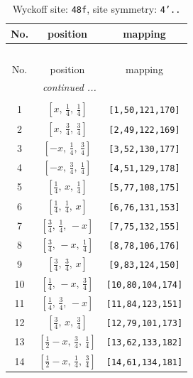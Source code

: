 \documentclass[fleqn,8pt]{jsarticle}
\begin{document}
\begin{longtable}{ccc}
\caption{Wyckoff site: {\tt 48f}, site symmetry: {\tt 4'..}}
 \\
 \hline \hline
No. & position & mapping \\ \hline \endfirsthead

\multicolumn{2}{l}{\tablename\ \thetable{}} \\
 \hline \hline
No. & position & mapping \\ \hline \endhead

 \hline \hline
\multicolumn{2}{r}{\footnotesize\it continued ...} \\ \endfoot

 \hline \hline
\multicolumn{2}{r}{} \\ \endlastfoot

1 & $\left[ x,\, \frac{1}{4},\, \frac{1}{4} \right]$ & {\tt [1,50,121,170]} \\ \hline
2 & $\left[ x,\, \frac{3}{4},\, \frac{3}{4} \right]$ & {\tt [2,49,122,169]} \\ \hline
3 & $\left[ - x,\, \frac{1}{4},\, \frac{3}{4} \right]$ & {\tt [3,52,130,177]} \\ \hline
4 & $\left[ - x,\, \frac{3}{4},\, \frac{1}{4} \right]$ & {\tt [4,51,129,178]} \\ \hline
5 & $\left[ \frac{1}{4},\, x,\, \frac{1}{4} \right]$ & {\tt [5,77,108,175]} \\ \hline
6 & $\left[ \frac{1}{4},\, \frac{1}{4},\, x \right]$ & {\tt [6,76,131,153]} \\ \hline
7 & $\left[ \frac{3}{4},\, \frac{1}{4},\, - x \right]$ & {\tt [7,75,132,155]} \\ \hline
8 & $\left[ \frac{3}{4},\, - x,\, \frac{1}{4} \right]$ & {\tt [8,78,106,176]} \\ \hline
9 & $\left[ \frac{3}{4},\, \frac{3}{4},\, x \right]$ & {\tt [9,83,124,150]} \\ \hline
10 & $\left[ \frac{1}{4},\, - x,\, \frac{3}{4} \right]$ & {\tt [10,80,104,174]} \\ \hline
11 & $\left[ \frac{1}{4},\, \frac{3}{4},\, - x \right]$ & {\tt [11,84,123,151]} \\ \hline
12 & $\left[ \frac{3}{4},\, x,\, \frac{3}{4} \right]$ & {\tt [12,79,101,173]} \\ \hline
13 & $\left[ \frac{1}{2} - x,\, \frac{3}{4},\, \frac{1}{4} \right]$ & {\tt [13,62,133,182]} \\ \hline
14 & $\left[ \frac{1}{2} - x,\, \frac{1}{4},\, \frac{3}{4} \right]$ & {\tt [14,61,134,181]} \\ \hline

\end{longtable}
\end{document}
